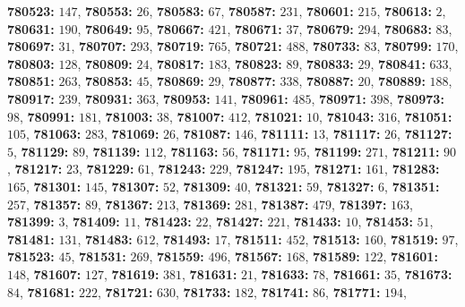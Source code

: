\textsf{\bfseries 780523:} $147$, \textsf{\bfseries 780553:} $26$, \textsf{\bfseries 780583:} $67$, \textsf{\bfseries 780587:} $231$, \textsf{\bfseries 780601:} $215$, \textsf{\bfseries 780613:} $2$, \textsf{\bfseries 780631:} $190$, \textsf{\bfseries 780649:} $95$, \textsf{\bfseries 780667:} $421$, \textsf{\bfseries 780671:} $37$, \textsf{\bfseries 780679:} $294$, \textsf{\bfseries 780683:} $83$, \textsf{\bfseries 780697:} $31$, \textsf{\bfseries 780707:} $293$, \textsf{\bfseries 780719:} $765$, \textsf{\bfseries 780721:} $488$, \textsf{\bfseries 780733:} $83$, \textsf{\bfseries 780799:} $170$, \textsf{\bfseries 780803:} $128$, \textsf{\bfseries 780809:} $24$, \textsf{\bfseries 780817:} $183$, \textsf{\bfseries 780823:} $89$, \textsf{\bfseries 780833:} $29$, \textsf{\bfseries 780841:} $633$, \textsf{\bfseries 780851:} $263$, \textsf{\bfseries 780853:} $45$, \textsf{\bfseries 780869:} $29$, \textsf{\bfseries 780877:} $338$, \textsf{\bfseries 780887:} $20$, \textsf{\bfseries 780889:} $188$, \textsf{\bfseries 780917:} $239$, \textsf{\bfseries 780931:} $363$, \textsf{\bfseries 780953:} $141$, \textsf{\bfseries 780961:} $485$, \textsf{\bfseries 780971:} $398$, \textsf{\bfseries 780973:} $98$, \textsf{\bfseries 780991:} $181$, \textsf{\bfseries 781003:} $38$, \textsf{\bfseries 781007:} $412$, \textsf{\bfseries 781021:} $10$, \textsf{\bfseries 781043:} $316$, \textsf{\bfseries 781051:} $105$, \textsf{\bfseries 781063:} $283$, \textsf{\bfseries 781069:} $26$, \textsf{\bfseries 781087:} $146$, \textsf{\bfseries 781111:} $13$, \textsf{\bfseries 781117:} $26$, \textsf{\bfseries 781127:} $5$, \textsf{\bfseries 781129:} $89$, \textsf{\bfseries 781139:} $112$, \textsf{\bfseries 781163:} $56$, \textsf{\bfseries 781171:} $95$, \textsf{\bfseries 781199:} $271$, \textsf{\bfseries 781211:} $90$, \textsf{\bfseries 781217:} $23$, \textsf{\bfseries 781229:} $61$, \textsf{\bfseries 781243:} $229$, \textsf{\bfseries 781247:} $195$, \textsf{\bfseries 781271:} $161$, \textsf{\bfseries 781283:} $165$, \textsf{\bfseries 781301:} $145$, \textsf{\bfseries 781307:} $52$, \textsf{\bfseries 781309:} $40$, \textsf{\bfseries 781321:} $59$, \textsf{\bfseries 781327:} $6$, \textsf{\bfseries 781351:} $257$, \textsf{\bfseries 781357:} $89$, \textsf{\bfseries 781367:} $213$, \textsf{\bfseries 781369:} $281$, \textsf{\bfseries 781387:} $479$, \textsf{\bfseries 781397:} $163$, \textsf{\bfseries 781399:} $3$, \textsf{\bfseries 781409:} $11$, \textsf{\bfseries 781423:} $22$, \textsf{\bfseries 781427:} $221$, \textsf{\bfseries 781433:} $10$, \textsf{\bfseries 781453:} $51$, \textsf{\bfseries 781481:} $131$, \textsf{\bfseries 781483:} $612$, \textsf{\bfseries 781493:} $17$, \textsf{\bfseries 781511:} $452$, \textsf{\bfseries 781513:} $160$, \textsf{\bfseries 781519:} $97$, \textsf{\bfseries 781523:} $45$, \textsf{\bfseries 781531:} $269$, \textsf{\bfseries 781559:} $496$, \textsf{\bfseries 781567:} $168$, \textsf{\bfseries 781589:} $122$, \textsf{\bfseries 781601:} $148$, \textsf{\bfseries 781607:} $127$, \textsf{\bfseries 781619:} $381$, \textsf{\bfseries 781631:} $21$, \textsf{\bfseries 781633:} $78$, \textsf{\bfseries 781661:} $35$, \textsf{\bfseries 781673:} $84$, \textsf{\bfseries 781681:} $222$, \textsf{\bfseries 781721:} $630$, \textsf{\bfseries 781733:} $182$, \textsf{\bfseries 781741:} $86$, \textsf{\bfseries 781771:} $194$, 
